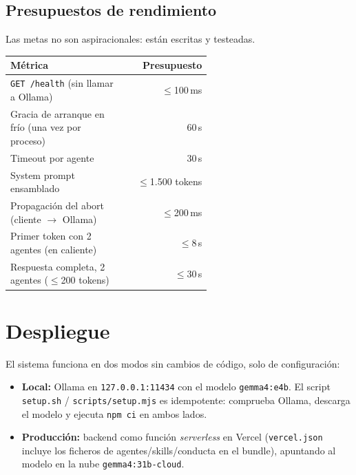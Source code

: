 \documentclass[11pt,a4paper]{article}
\newcommand{\code}[1]{\texttt{\small #1}}
\begin{document}
\subsection{Presupuestos de rendimiento}

Las metas no son aspiracionales: están escritas y testeadas.

\begin{center}
\renewcommand{\arraystretch}{1.25}
\begin{tabular}{@{}p{0.58\linewidth}r@{}}
\toprule
\textbf{Métrica} & \textbf{Presupuesto} \\
\midrule
\code{GET /health} (sin llamar a Ollama)            & $\leq$100\,ms \\
Gracia de arranque en frío (una vez por proceso)    & 60\,s \\
Timeout por agente                                  & 30\,s \\
System prompt ensamblado                            & $\leq$1.500 tokens \\
Propagación del abort (cliente $\rightarrow$ Ollama)& $\leq$200\,ms \\
Primer token con 2 agentes (en caliente)            & $\leq$8\,s \\
Respuesta completa, 2 agentes ($\leq$200 tokens)    & $\leq$30\,s \\
\bottomrule
\end{tabular}
\end{center}

\section{Despliegue}

El sistema funciona en dos modos sin cambios de código, solo de configuración:

\begin{itemize}
\item \textbf{Local:} Ollama en \code{127.0.0.1:11434} con el modelo
\code{gemma4:e4b}. El script \code{setup.sh} / \code{scripts/setup.mjs} es
idempotente: comprueba Ollama, descarga el modelo y ejecuta \code{npm ci} en
ambos lados.
\item \textbf{Producción:} backend como función \emph{serverless} en Vercel
(\code{vercel.json} incluye los ficheros de agentes/skills/conducta en el
bundle), apuntando al modelo en la nube \code{gemma4:31b-cloud}.
\end{itemize}
\end{document}
